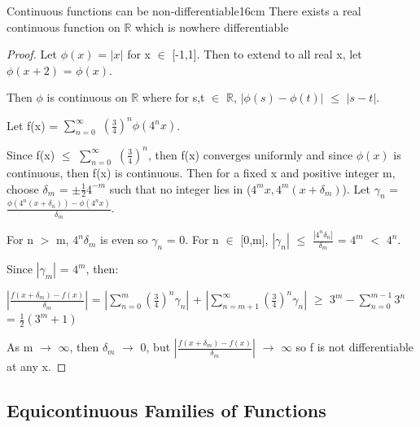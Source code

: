     \newpage



    \begin{wtheorem}{Continuous functions can be non-differentiable}{16cm}
        There exists a real continuous function on $\mathbb{R}$ which is
        nowhere differentiable
    \end{wtheorem}

    \begin{proof}
        Let $\phi(x)$ = $|x|$ for x $\in$ [-1,1].
        Then to extend to all real x, let $\phi(x+2)$ = $\phi(x)$.

        Then $\phi$ is continuous on $\mathbb{R}$ where for s,t $\in$ $\mathbb{R}$,
        $|\phi(s) - \phi(t)|$ $\leq$ $|s-t|$.

        Let f(x) = $\sum_{n=0}^{\infty}$ $(\frac{3}{4})^n \phi(4^n x)$.


        Since f(x) $\leq$ $\sum_{n=0}^{\infty}$ $(\frac{3}{4})^n$, then f(x)
        converges uniformly and since $\phi(x)$ is continuous, then f(x)
        is continuous.
        Then for a fixed x and positive integer m, choose
        $\delta_m$ = $\pm \frac{1}{2} 4^{-m}$ such that
        no integer lies in ($4^mx, 4^m(x+\delta_m)$).
        Let $\gamma_n$ = $\frac{\phi(4^n(x+\delta_n)) - \phi(4^nx)}{\delta_m}$.
        
        For n $>$ m, $4^n\delta_m$ is even so $\gamma_n$ = 0.
        For n $\in$ [0,m], $|\gamma_n|$ $\leq$ $\frac{|4^n\delta_n|}{\delta_m}$
        = $4^m$ $<$ $4^n$.

        Since $|\gamma_m|$ = $4^m$, then:

        \hspace{0.5cm}
        $|\frac{f(x+\delta_m) - f(x)}{\delta_m}|$
        = $|\sum_{n=0}^m (\frac{3}{4})^n \gamma_n|$
            + $|\sum_{n=m+1}^{\infty} (\frac{3}{4})^n \gamma_n|$
        $\geq$ $3^m - \sum_{n=0}^{m-1} 3^n$
        = $\frac{1}{2}(3^m + 1)$
        
        As m $\rightarrow$ $\infty$, then $\delta_m$ $\rightarrow$ 0, but
        $|\frac{f(x+\delta_m) - f(x)}{\delta_m}|$ $\rightarrow$ $\infty$
        so f is not differentiable at any x.
    \end{proof}

    \vspace{0.5cm}





\subsection[ Equicontinuous ]{ Equicontinuous Families of Functions }

